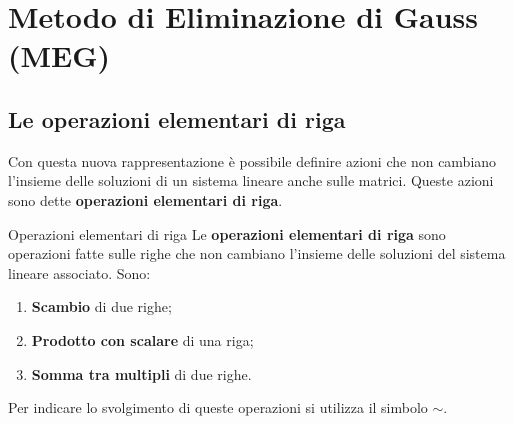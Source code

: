 \section{Metodo di Eliminazione di Gauss (MEG)}
\subsection{Le operazioni elementari di riga}
Con questa nuova rappresentazione è possibile definire azioni che non cambiano l'insieme delle soluzioni di un sistema lineare anche sulle matrici. Queste azioni sono dette \textbf{operazioni elementari di riga}.
\begin{newdef}{Operazioni elementari di riga}
    Le \textbf{operazioni elementari di riga} sono operazioni fatte sulle righe che non cambiano l'insieme delle soluzioni del sistema lineare associato. Sono:
    \begin{enumerate}
        \item \textbf{Scambio} di due righe;
        \item \textbf{Prodotto con scalare} di una riga;
        \item \textbf{Somma tra multipli} di due righe.
    \end{enumerate}
    Per indicare lo svolgimento di queste operazioni si utilizza il simbolo $\sim$.
\end{newdef}

